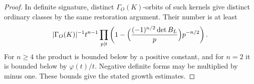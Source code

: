 \begin{proof}
In definite signature, distinct \(\Gamma_O(K)\)-orbits of such kernels give distinct ordinary classes by the same restoration argument. Their number is at least
\[
 |\Gamma_O(K)|^{-1}t^{n-1}\prod_{p\mid t}
   \left(1-\Bigl(\frac{(-1)^{n/2}\det B_L}{p}\Bigr)p^{-n/2}\right).
\]
For \(n\ge4\) the product is bounded below by a positive constant, and for \(n=2\) it is bounded below by \(\varphi(t)/t\). Negative definite forms may be multiplied by minus one. These bounds give the stated growth estimates.
\end{proof}

